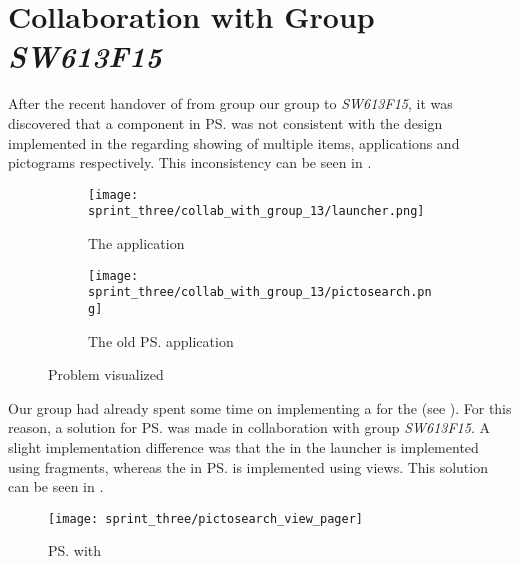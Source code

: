 
\section{Collaboration with Group \emph{SW613F15}}
\label{sec:collaboration_with_group_sw613f15}

After the recent handover of \gc from group our group to \emph{SW613F15}, it was discovered that a component in \ps was not consistent with the design implemented in the \launcher regarding showing of multiple items, applications and pictograms respectively. This inconsistency can be seen in .

\begin{figure}[!htbp]
    \centering

    \begin{subfigure}[t]{0.75\textwidth}
        \texttt{[image: sprint\_three/collab\_with\_group\_13/launcher.png]}
        \caption{The \launcher application}
        \label{fig:collab_with_group_13_launhcer}
        \vspace*{1cm}
    \end{subfigure}
    \hfill
    \begin{subfigure}[t]{0.75\textwidth}
        \texttt{[image: sprint\_three/collab\_with\_group\_13/pictosearch.png]}
        \caption{The old \ps application}
        \label{fig:collab_with_group_13_pictosearch}
    \end{subfigure}
    
    \caption{Problem visualized}
    \label{fig:collab_with_group_13}
\end{figure}

Our group had already spent some time on implementing a  for the \launcher (see ). For this reason, a solution for \ps was made in collaboration with group \emph{SW613F15}. A slight implementation difference was that the  in the launcher is implemented using fragments, whereas the  in \ps is implemented using views. This solution can be seen in . 

\begin{figure}[!htbp]
    \centering
    \texttt{[image: sprint\_three/pictosearch\_view\_pager]}
    \caption{\ps with }
    \label{fig:pictosearch_view_pager}
\end{figure}

